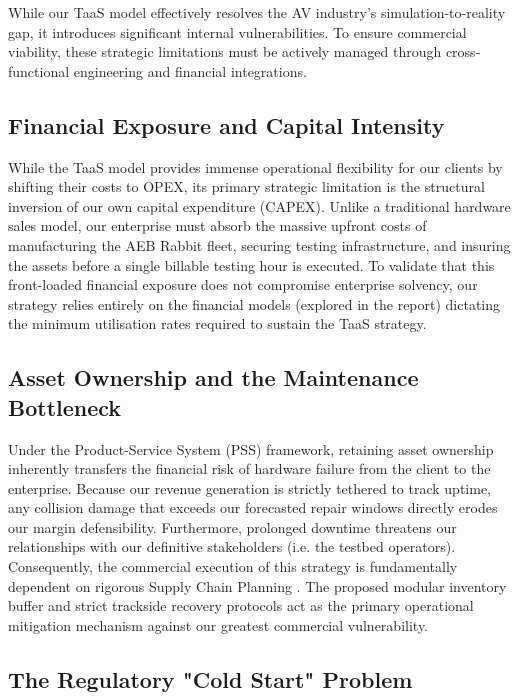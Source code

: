 While our TaaS model effectively resolves the AV industry's simulation-to-reality gap, it introduces significant internal vulnerabilities. To ensure commercial viability, these strategic limitations must be actively managed through cross-functional engineering and financial integrations.

\subsection{Financial Exposure and Capital Intensity}

While the TaaS model provides immense operational flexibility for our clients by shifting their costs to OPEX, its primary strategic limitation is the structural inversion of our own capital expenditure (CAPEX). Unlike a traditional hardware sales model, our enterprise must absorb the massive upfront costs of manufacturing the AEB Rabbit fleet, securing testing infrastructure, and insuring the assets before a single billable testing hour is executed. To validate that this front-loaded financial exposure does not compromise enterprise solvency, our strategy relies entirely on the financial models (explored in %
 the report) dictating the minimum utilisation rates required to sustain the TaaS strategy.

\subsection{Asset Ownership and the Maintenance Bottleneck}

Under the Product-Service System (PSS) framework, retaining asset ownership inherently transfers the financial risk of hardware failure from the client to the enterprise. Because our revenue generation is strictly tethered to track uptime, any collision damage that exceeds our forecasted repair windows directly erodes our margin defensibility. Furthermore, prolonged downtime threatens our relationships with our definitive stakeholders (i.e. the testbed operators). Consequently, the commercial execution of this strategy is fundamentally dependent on rigorous Supply Chain Planning %
. The proposed modular inventory buffer and strict trackside recovery protocols act as the primary operational mitigation mechanism against our greatest commercial vulnerability.

\subsection{The Regulatory "Cold Start" Problem}

